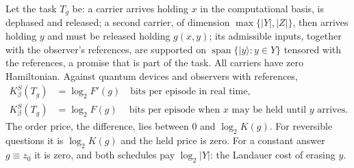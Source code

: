 \begin{theorem}\label{thm:classes}
Let the task $T_g$ be: a carrier arrives holding $x$ in the computational basis, is dephased and released; a second carrier, of dimension $\max\{|Y|,|Z|\}$, then arrives holding $y$ and must be released holding $g(x,y)$; its admissible inputs, together with the observer's references, are supported on $\operatorname{span}\{|y\rangle:y\in Y\}$ tensored with the references, a promise that is part of the task. All carriers have zero Hamiltonian. Against quantum devices and observers with references,
\begin{align*}
K_\beta^{S}(T_g)&=\log_2F'(g)\quad\text{bits per episode in real time},\\
K_\beta^{S}(T_g)&=\log_2F(g)\quad\ \text{bits per episode when $x$ may be held until $y$ arrives.}
\end{align*}
The order price, the difference, lies between $0$ and $\log_2K(g)$. For reversible questions it is $\log_2K(g)$ and the held price is zero. For a constant answer $g\equiv z_0$ it is zero, and both schedules pay $\log_2|Y|$: the Landauer cost of erasing $y$.
\end{theorem}

